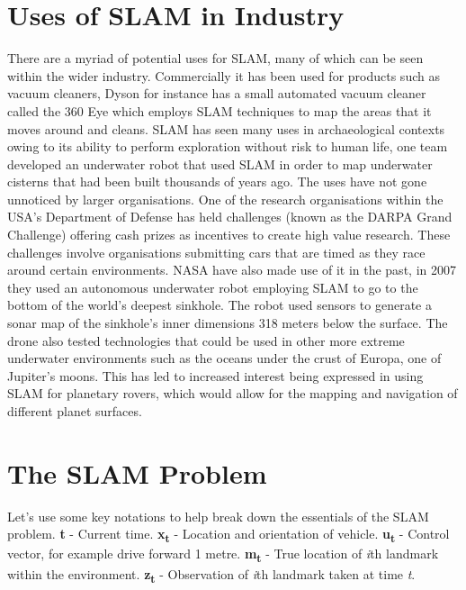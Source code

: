 			\section{Uses of SLAM in Industry}
			There are a myriad of potential uses for SLAM, many of which can be seen within the wider industry. Commercially it has been used for products such as vacuum cleaners, Dyson for instance has a small automated vacuum cleaner called the 360 Eye which employs SLAM techniques to map the areas that it moves around and cleans. SLAM has seen many uses in archaeological contexts owing to its ability to perform exploration without risk to human life, one team \citep{clark2008archaeology} developed an underwater robot that used SLAM in order to map underwater cisterns that had been built thousands of years ago. The uses have not gone unnoticed by larger organisations. One of the research organisations within the USA's Department of Defense has held challenges (known as the DARPA Grand Challenge) offering cash prizes as incentives to create high value research. These challenges involve organisations submitting cars that are timed as they race around certain environments. NASA have also made use of it in the past, in 2007 they used an autonomous underwater robot \citep{carnegie2007sinkhole} employing SLAM to go to the bottom of the world's deepest sinkhole. The robot used sensors to generate a sonar map of the sinkhole's inner dimensions 318 meters below the surface.  The drone also tested technologies that could be used in other more extreme underwater environments such as the oceans under the crust of Europa, one of Jupiter's moons. This has led to increased interest being expressed in using SLAM for planetary rovers, which would allow for the mapping and navigation of different planet surfaces.
			\medskip
		
			\section{The SLAM Problem}
			\label{litreview:slamproblem}
			Let's use some key notations to help break down the essentials of the SLAM problem. \newline
			\textbf{t} - Current time. \newline
			\textbf{x\textsubscript{t}} - Location and orientation of vehicle. \newline
			\textbf{u\textsubscript{t}} - Control vector, for example drive forward 1 metre.  \newline
			\textbf{m\textsubscript{t}} - True location of \textit{i}th landmark within the environment. \newline
			\textbf{z\textsubscript{t}} - Observation of \textit{i}th landmark taken at time \textit{t}.\newline
			
